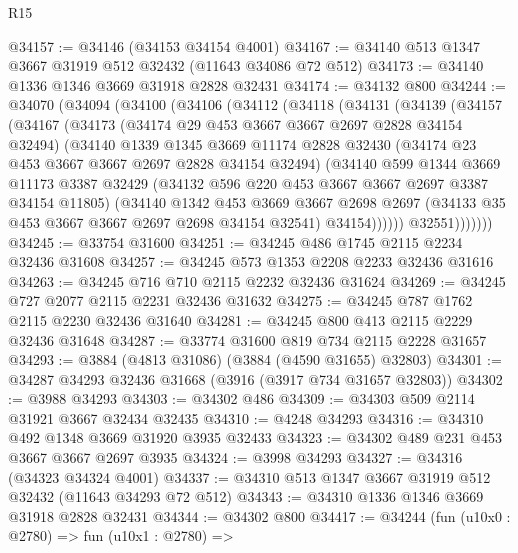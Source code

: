 \begin{lexlean}{R15}
\begin{coremodule}
@34157 := @34146 (@34153 @34154 @4001)
@34167 := @34140 @513 @1347 @3667 @31919 @512 @32432 (@11643 @34086 @72 @512)
@34173 := @34140 @1336 @1346 @3669 @31918 @2828 @32431
@34174 := @34132 @800
@34244 := @34070
    (@34094
      (@34100
        (@34106
          (@34112
            (@34118
              (@34131
                (@34139
                  (@34157
                    (@34167
                      (@34173
                        (@34174 @29 @453 @3667 @3667 @2697 @2828 @34154 @32494)
                        (@34140
                          @1339
                          @1345
                          @3669
                          @11174
                          @2828
                          @32430
                          (@34174 @23 @453 @3667 @3667 @2697 @2828 @34154 @32494)
                          (@34140
                            @599
                            @1344
                            @3669
                            @11173
                            @3387
                            @32429
                            (@34132 @596 @220 @453 @3667 @3667 @2697 @3387 @34154 @11805)
                            (@34140
                              @1342
                              @453
                              @3669
                              @3667
                              @2698
                              @2697
                              (@34133 @35 @453 @3667 @3667 @2697 @2698 @34154 @32541)
                              @34154))))))
                  @32551)))))))
@34245 := @33754 @31600
@34251 := @34245 @486 @1745 @2115 @2234 @32436 @31608
@34257 := @34245 @573 @1353 @2208 @2233 @32436 @31616
@34263 := @34245 @716 @710 @2115 @2232 @32436 @31624
@34269 := @34245 @727 @2077 @2115 @2231 @32436 @31632
@34275 := @34245 @787 @1762 @2115 @2230 @32436 @31640
@34281 := @34245 @800 @413 @2115 @2229 @32436 @31648
@34287 := @33774 @31600 @819 @734 @2115 @2228 @31657
@34293 := @3884 (@4813 @31086) (@3884 (@4590 @31655) @32803)
@34301 := @34287 @34293 @32436 @31668 (@3916 (@3917 @734 @31657 @32803))
@34302 := @3988 @34293
@34303 := @34302 @486
@34309 := @34303 @509 @2114 @31921 @3667 @32434 @32435
@34310 := @4248 @34293
@34316 := @34310 @492 @1348 @3669 @31920 @3935 @32433
@34323 := @34302 @489 @231 @453 @3667 @3667 @2697 @3935
@34324 := @3998 @34293
@34327 := @34316 (@34323 @34324 @4001)
@34337 := @34310 @513 @1347 @3667 @31919 @512 @32432 (@11643 @34293 @72 @512)
@34343 := @34310 @1336 @1346 @3669 @31918 @2828 @32431
@34344 := @34302 @800
@34417 := @34244
    (fun (u10x0 : @2780) =>
    fun (u10x1 : @2780) =>

\end{coremodule}
\end{lexlean}
